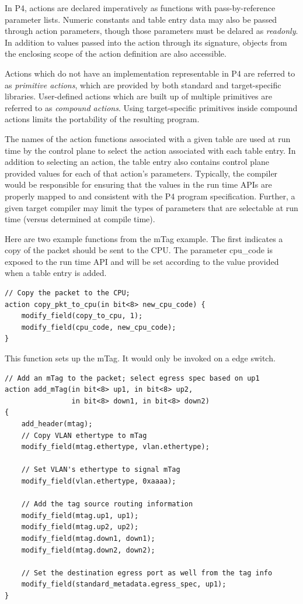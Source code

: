 \documentclass[12pt]{article}
\begin{document}

In P4, actions are declared imperatively as functions with pass-by-reference
parameter lists. Numeric constants and table entry data may also be passed
through action parameters, though those parameters must be delared as
\textit{readonly}. In addition to values passed into the action through its 
signature, objects from the enclosing scope of the action definition are also 
accessible.

Actions which do not have an implementation representable in P4 are 
referred to as \textit{primitive actions}, which are provided by both standard
and target-specific libraries. User-defined actions which are built up of
multiple primitives are referred to as \textit{compound actions}. Using
target-specific primitives inside compound actions limits the portability of
the resulting program.

The names of the action functions associated with a given table are used at
run time by the control plane to select the action associated with each table
entry. In addition to selecting an action, the table entry also contains control 
plane provided values for each of that action's parameters. Typically, the 
compiler would be responsible for ensuring that the values in the run time APIs 
are properly mapped to and consistent with the P4 program specification.
Further, a given target compiler may limit the types of parameters that are
selectable at run time (versus determined at compile time).

Here are two example functions from the mTag example. The first indicates a
copy of the packet should be sent to the CPU. The parameter cpu_code is exposed
to the run time API and will be set according to the value provided when a table
entry is added.

\begin{lstlisting}[style=P4style]
// Copy the packet to the CPU;
action copy_pkt_to_cpu(in bit<8> new_cpu_code) {
    modify_field(copy_to_cpu, 1);
    modify_field(cpu_code, new_cpu_code);
}
\end{lstlisting}


This function sets up the mTag. It would only be invoked on a edge switch.

\begin{lstlisting}[style=P4style]
// Add an mTag to the packet; select egress spec based on up1
action add_mTag(in bit<8> up1, in bit<8> up2,
                in bit<8> down1, in bit<8> down2)
{
    add_header(mtag);
    // Copy VLAN ethertype to mTag
    modify_field(mtag.ethertype, vlan.ethertype);

    // Set VLAN's ethertype to signal mTag
    modify_field(vlan.ethertype, 0xaaaa);

    // Add the tag source routing information
    modify_field(mtag.up1, up1);
    modify_field(mtag.up2, up2);
    modify_field(mtag.down1, down1);
    modify_field(mtag.down2, down2);

    // Set the destination egress port as well from the tag info
    modify_field(standard_metadata.egress_spec, up1);
}
\end{lstlisting}
\end{document}
